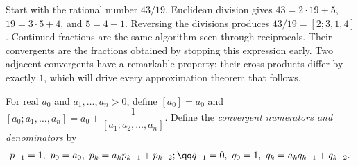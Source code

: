 Start with the rational number $43/19$. Euclidean division gives $43=2\cdot19+5$, $19=3\cdot5+4$, and $5=4+1$. Reversing the divisions produces $43/19=[2;3,1,4]$. Continued fractions are the same algorithm seen through reciprocals. Their convergents are the fractions obtained by stopping this expression early. Two adjacent convergents have a remarkable property: their cross-products differ by exactly $1$, which will drive every approximation theorem that follows.

For real $a_0$ and $a_1,\dots,a_n>0$, define $[a_0]=a_0$ and $[a_0;a_1,\dots,a_n]=a_0+\dfrac1{[a_1;a_2,\dots,a_n]}$. Define the \emph{convergent numerators and denominators} by
\[
\begin{gathered}p_{-1}=1,\ p_0=a_0,\ p_k=a_kp_{k-1}+p_{k-2};\qq q_{-1}=0,\ q_0=1,\ q_k=a_kq_{k-1}+q_{k-2}.\end{gathered}
\]

